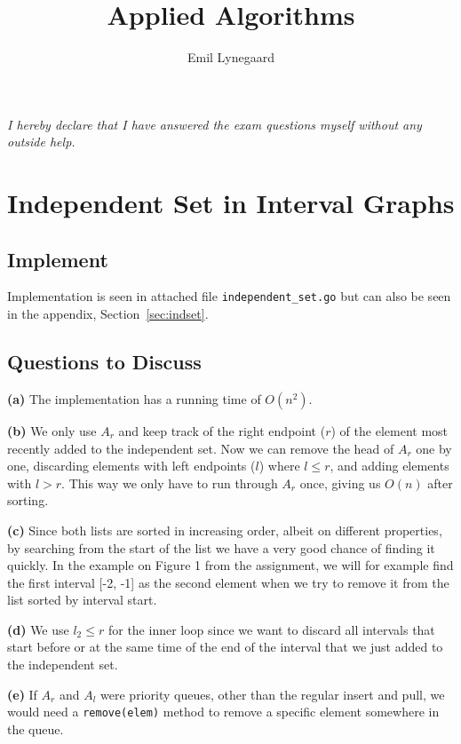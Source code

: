 \documentclass[a5paper]{article}
\title{Applied Algorithms}
\author{Emil Lynegaard}
\begin{document}


\maketitle
\textit{I hereby declare that I have answered the exam questions myself without any outside help.}\\
\newpage

\newpage
\tableofcontents
\newpage

\section{Independent Set in Interval Graphs}
\subsection{Implement}
Implementation is seen in attached file \texttt{independent\_set.go} but can also be seen in the appendix, Section~\ref{sec:indset}.

\subsection{Questions to Discuss}
\textbf{(a)} 
The implementation has a running time of  $O(n^2)$.

\textbf{(b)}
We only use $A_r$ and keep track of the right endpoint ($r$) of the element most recently added to the independent set.
Now we can remove the head of $A_r$ one by one, discarding elements with left endpoints ($l$) where $l \leq r$, and adding
elements with $l > r$. This way we only have to run through $A_r$ once, giving us $O(n)$ after sorting.

\textbf{(c)}
Since both lists are sorted in increasing order, albeit on different properties, by searching from the start of the list
we have a very good chance of finding it quickly. In the example on Figure 1 from the assignment, we will for example
find the first interval [-2, -1] as the second element when we try to remove it from the list sorted by interval start.

\textbf{(d)}
We use $l_2 \leq r$ for the inner loop since we want to discard all intervals that start before or at the same time of the end of the interval
that we just added to the independent set.

\textbf{(e)}
If $A_r$ and $A_l$ were priority queues, other than the regular insert and pull, we would need a \texttt{remove(elem)} method to remove
a specific element somewhere in the queue.
\end{document}
